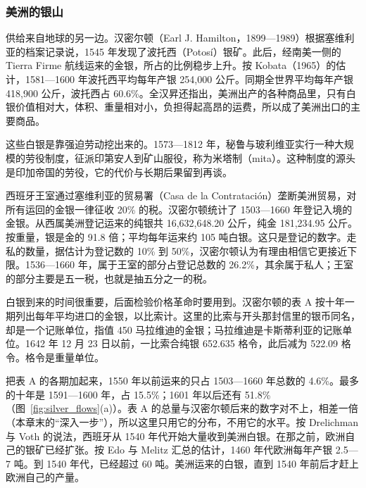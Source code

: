 \subsubsection{美洲的银山}
供给来自地球的另一边。汉密尔顿（Earl J. Hamilton，1899—1989）根据塞维利亚的档案记录说，1545 年发现了波托西（Potosí）银矿。此后，经南美一侧的 Tierra Firme 航线运来的金银，所占的比例稳步上升\cite{hamilton1929}。按 Kobata（1965）的估计，1581—1600 年波托西平均每年产银 254,000 公斤。同期全世界平均每年产银 418,900 公斤，波托西占 60.6\%\cite{quan1968,quan1969}。全汉昇还指出，美洲出产的各种商品里，只有白银价值相对大，体积、重量相对小，负担得起高昂的运费，所以成了美洲出口的主要商品\cite{quan1969}。

这些白银是靠强迫劳动挖出来的。1573—1812 年，秘鲁与玻利维亚实行一种大规模的劳役制度，征派印第安人到矿山服役，称为米塔制（mita）\cite{dell2010}。这种制度的源头是印加帝国的劳役，它的代价与长期后果留到再谈。

西班牙王室通过塞维利亚的贸易署（Casa de la Contratación）垄断美洲贸易，对所有运回的金银一律征收 20\% 的税\cite{dv2010}。汉密尔顿统计了 1503—1660 年登记入境的金银。从西属美洲登记运来的纯银共 16,632,648.20 公斤，纯金 181,234.95 公斤\cite{hamilton1929}。按重量，银是金的 91.8 倍；平均每年运来约 105 吨白银。这只是登记的数字。走私的数量，据估计为登记数的 10\% 到 50\%，汉密尔顿认为有理由相信它更接近下限\cite{hamilton1929}。1536—1660 年，属于王室的部分占登记总数的 26.2\%，其余属于私人；王室的部分主要是五一税，也就是抽五分之一的税\cite{hamilton1929}。

白银到来的时间很重要，后面检验价格革命时要用到。汉密尔顿的表 A 按十年一期列出每年平均进口的金银，以比索计。这里的比索与开头那封信里的银币同名，却是一个记账单位，指值 450 马拉维迪的金银；马拉维迪是卡斯蒂利亚的记账单位。1642 年 12 月 23 日以前，一比索合纯银 652.635 格令，此后减为 522.09 格令\cite{hamilton1929}。格令是重量单位。

把表 A 的各期加起来，1550 年以前运来的只占 1503—1660 年总数的 4.6\%。最多的十年是 1591—1600 年，占 15.5\%；1601 年以后还有 51.8\%（图~\ref{fig:silver_flows}(a)）。表 A 的总量与汉密尔顿后来的数字对不上，相差一倍（本章末的“深入一步”），所以这里只用它的分布，不用它的水平。按 Drelichman 与 Voth 的说法，西班牙从 1540 年代开始大量收到美洲白银\cite{dv2010}。在那之前，欧洲自己的银矿已经扩张。按 Edo 与 Melitz 汇总的估计，1460 年代欧洲每年产银 2.5—7 吨。到 1540 年代，已经超过 60 吨。美洲运来的白银，直到 1540 年前后才赶上欧洲自己的产量\cite{em2019}。


